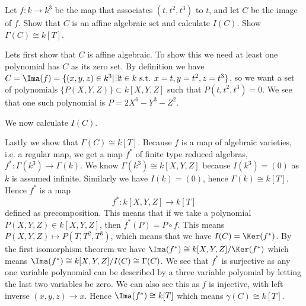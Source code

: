 \begin{problem}[1.7]
Let $f:k\longrightarrow k^3$ be the map that associates $(t, t^2, t^3)$ to $t$, and let $C$ be the image of $f$. Show that $C$ is an affine algebraic set and calculate $I(C)$. Show $\Gamma (C)\cong k[T]$. 

\begin{solution}
Lets first show that $C$ is affine algebraic. To show this we need at least one polynomial has $C$ as its zero set. By definition we have $C=\Ima (f) = \{ (x, y, z)\in k^3 \vert \exists t\in k \text{ s.t. } x=t, y=t^2, z=t^3\}$, so we want a set of polynomials $\{P(X, Y, Z)\}\subset k[X, Y, Z]$ such that $P(t, t^2, t^3)=0$. We see that one such polynomial is $P=2X^6-Y^3-Z^2$. 

We now calculate $I(C)$. 

Lastly we show that $\Gamma(C)\cong k[T]$. Because $f$ is a map of algebraic varieties, i.e. a regular map, we get a map $f^*$ of finite type reduced algebras, $f^*:\Gamma(k^3)\longrightarrow \Gamma(k)$. We know $\Gamma(k^3)\cong k[X, Y, Z]$ because $I(k^3)=(0)$ as $k$ is assumed infinite. Similarly we have $I(k)=(0)$, hence $\Gamma(k)\cong k[T]$. Hence $f^*$ is a map
\begin{equation*}
    f^*: k[X, Y, Z]\longrightarrow k[T]
\end{equation*}
defined as precomposition. This means that if we take a polynomial $P(X, Y, Z)\in k[X, Y, Z]$, then $f^*(P)=P \circ f$. This means $P(X, Y, Z)\mapsto P(T, T^2, T^3)$, which means that we have $I(C)=\Ker (f^*)$. By the first isomorphism theorem we have $\Ima(f^*)\cong k[X, Y, Z]/\Ker (f^*)$ which means $\Ima(f^*)\cong k[X, Y, Z]/I(C)\cong \Gamma(C)$. We see that $f^*$ is surjective as any one variable polynomial can be described by a three variable polyomial by letting the last two variables be zero. We can also see this as $f$ is injective, with left inverse $(x, y, z)\rightarrow x$. Hence $\Ima(f^*)\cong k[T]$ which means $\gamma(C)\cong k[T]$. 
\end{solution}
\end{problem}


